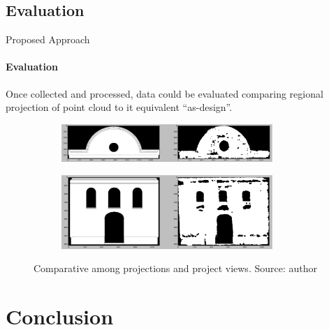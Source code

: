 \documentclass{beamer}
\begin{document}
\subsection{Evaluation}

\begin{frame}{Proposed Approach}
  \framesubtitle{Evaluation}

    Once collected and processed, data could be evaluated comparing regional projection of point cloud to it equivalent “as-design”.    
    
    \begin{figure}
    \begin{subfigure}{1\linewidth}
        \begin{center}
            \includegraphics[width=8cm]{images/compare_clock}
        \end{center}
    \end{subfigure}
    \begin{subfigure}{1\linewidth}
        \begin{center}
            \includegraphics[width=8cm]{images/compare_wall}
        \end{center}
    \end{subfigure}
      \caption{Comparative among projections and project views. Source: author}
    \end{figure}
        
\end{frame}


\section{Conclusion}
\end{document}
